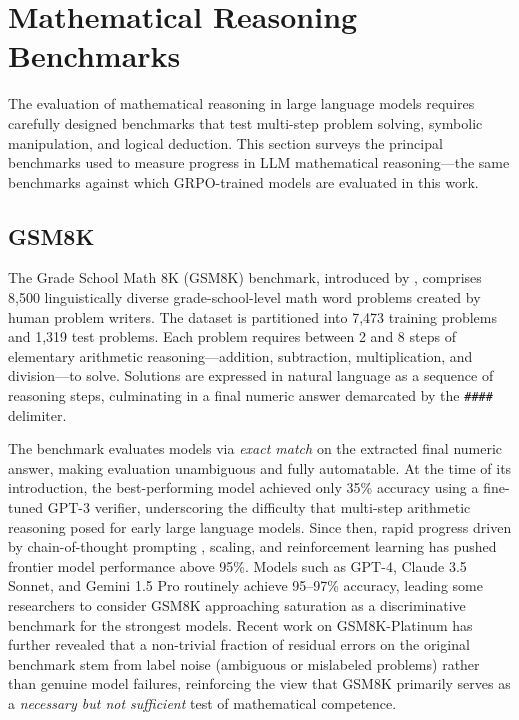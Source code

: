 \section{Mathematical Reasoning Benchmarks}
\label{sec:math-benchmarks}

The evaluation of mathematical reasoning in large language models requires carefully designed benchmarks that test multi-step problem solving, symbolic manipulation, and logical deduction. This section surveys the principal benchmarks used to measure progress in LLM mathematical reasoning---the same benchmarks against which GRPO-trained models are evaluated in this work.

\subsection{GSM8K}

The Grade School Math 8K (GSM8K) benchmark, introduced by \cite{cobbe2021gsm8k}, comprises 8,500 linguistically diverse grade-school-level math word problems created by human problem writers. The dataset is partitioned into 7,473 training problems and 1,319 test problems. Each problem requires between 2 and 8 steps of elementary arithmetic reasoning---addition, subtraction, multiplication, and division---to solve. Solutions are expressed in natural language as a sequence of reasoning steps, culminating in a final numeric answer demarcated by the \texttt{\#\#\#\#} delimiter.

The benchmark evaluates models via \emph{exact match} on the extracted final numeric answer, making evaluation unambiguous and fully automatable. At the time of its introduction, the best-performing model achieved only 35\% accuracy using a fine-tuned GPT-3 verifier, underscoring the difficulty that multi-step arithmetic reasoning posed for early large language models. Since then, rapid progress driven by chain-of-thought prompting \cite{wei2022chainofthought}, scaling, and reinforcement learning has pushed frontier model performance above 95\%. Models such as GPT-4, Claude 3.5 Sonnet, and Gemini 1.5 Pro routinely achieve 95--97\% accuracy, leading some researchers to consider GSM8K approaching saturation as a discriminative benchmark for the strongest models. Recent work on GSM8K-Platinum has further revealed that a non-trivial fraction of residual errors on the original benchmark stem from label noise (ambiguous or mislabeled problems) rather than genuine model failures, reinforcing the view that GSM8K primarily serves as a \emph{necessary but not sufficient} test of mathematical competence.

